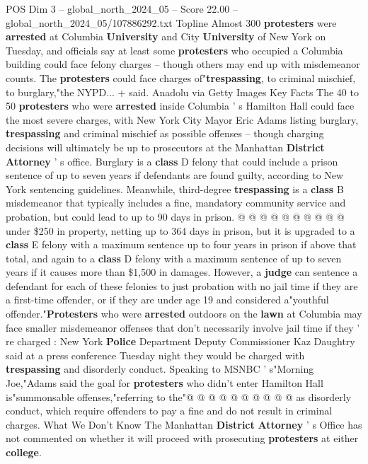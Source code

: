 \begin{textsample}{POS Dim 3 – global\_north\_2024\_05 – Score 22.00 – global\_north\_2024\_05/107886292.txt}  \label{ex:f3_pos_017}
Topline Almost 300 \textbf{protesters} were \textbf{arrested} at Columbia \textbf{University} and City \textbf{University} of New York on Tuesday, and officials say at least some \textbf{protesters} who occupied a Columbia building could face felony charges -- though others may end up with misdemeanor counts.
The \textbf{protesters} could face charges of"\textbf{trespassing}, to criminal mischief, to burglary,"the NYPD... + said.
Anadolu via Getty Images Key Facts The 40 to 50 \textbf{protesters} who were \textbf{arrested} inside Columbia ' s Hamilton Hall could face the most severe charges, with New York City Mayor Eric Adams listing burglary, \textbf{trespassing} and criminal mischief as possible offenses -- though charging decisions will ultimately be up to prosecutors at the Manhattan \textbf{District} \textbf{Attorney} ' s office.
Burglary is a \textbf{class} D felony that could include a prison sentence of up to seven years if defendants are found guilty, according to New York sentencing guidelines.
Meanwhile, third-degree \textbf{trespassing} is a \textbf{class} B misdemeanor that typically includes a fine, mandatory community service and probation, but could lead to up to 90 days in prison. @ @ @ @ @ @ @ @ @ @ under \$250 in property, netting up to 364 days in prison, but it is upgraded to a \textbf{class} E felony with a maximum sentence up to four years in prison if above that total, and again to a \textbf{class} D felony with a maximum sentence of up to seven years if it causes more than \$1,500 in damages.
However, a \textbf{judge} can sentence a defendant for each of these felonies to just probation with no jail time if they are a first-time offender, or if they are under age 19 and considered a"youthful offender."\textbf{Protesters} who were \textbf{arrested} outdoors on the \textbf{lawn} at Columbia may face smaller misdemeanor offenses that don't necessarily involve jail time if they ' re charged : New York \textbf{Police} Department Deputy Commissioner Kaz Daughtry said at a press conference Tuesday night they would be charged with \textbf{trespassing} and disorderly conduct.
Speaking to MSNBC ' s"Morning Joe,"Adams said the goal for \textbf{protesters} who didn't enter Hamilton Hall is"summonsable offenses,"referring to the"@ @ @ @ @ @ @ @ @ @ as disorderly conduct, which require offenders to pay a fine and do not result in criminal charges.
What We Don't Know The Manhattan \textbf{District} \textbf{Attorney} ' s Office has not commented on whether it will proceed with prosecuting \textbf{protesters} at either \textbf{college}.

\end{textsample}
